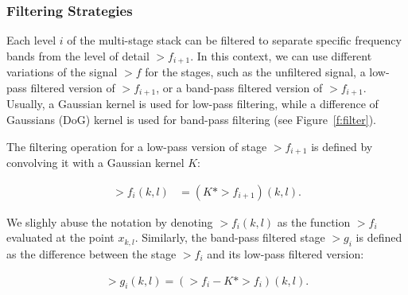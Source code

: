 \subsubsection{Filtering Strategies}

Each level $i$ of the multi-stage stack can be filtered to separate specific frequency bands from the level of detail $\gt{f}_{i+1}$. In this context, we can use different variations of the signal \(\gt{f}\) for the stages, such as the unfiltered signal, a low-pass filtered version of \(\gt{f}_{i+1}\), or a band-pass filtered version of \(\gt{f}_{i+1}\). Usually, a Gaussian kernel is used for low-pass filtering, while a difference of Gaussians (DoG) kernel is used for band-pass filtering (see Figure~\ref{f:filter}).

The filtering operation for a low-pass version of stage \(\gt{f}_{i+1}\) is defined by convolving it with a Gaussian kernel \( K \):

\begin{align}\label{e-gaussian-filter}
    \gt{f}_i(k,l) &= \left( K * \gt{f}_{i+1} \right)(k, l).
\end{align}

We slighly abuse the notation by denoting $\gt{f}_i(k,l)$ as the function $\gt{f}_i$ evaluated at the point $x_{k,l}$. Similarly, the band-pass filtered stage \(\gt{g}_i\) is defined as the difference between the stage \(\gt{f}_i\) and its low-pass filtered version:

\begin{align}
    \gt{g}_i(k,l) = \left( \gt{f}_{i} - K * \gt{f}_{i} \right)(k, l).
\end{align}

